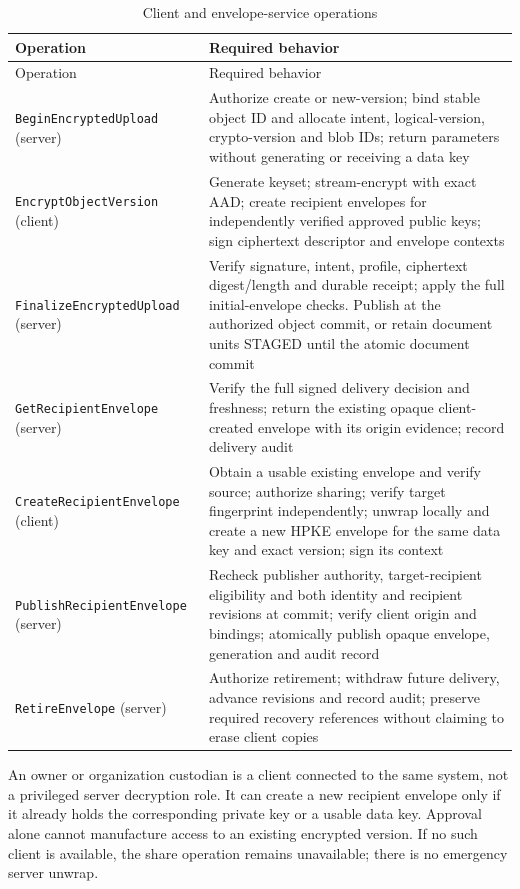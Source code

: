 \documentclass[11pt,a4paper]{article}
\newcommand{\code}[1]{{\small\nolinkurl{#1}}}
\begin{document}
\begin{longtable}{@{}P{0.29\textwidth}P{0.61\textwidth}@{}}
\caption{Client and envelope-service operations}\label{tab:broker}\\
\toprule Operation & Required behavior\\\midrule\endfirsthead
\toprule Operation & Required behavior\\\midrule\endhead
\code{BeginEncryptedUpload} (server) & Authorize create or new-version; bind stable object ID and allocate intent, logical-version, crypto-version and blob IDs; return parameters without generating or receiving a data key\\
\code{EncryptObjectVersion} (client) & Generate keyset; stream-encrypt with exact AAD; create recipient envelopes for independently verified approved public keys; sign ciphertext descriptor and envelope contexts\\
\code{FinalizeEncryptedUpload} (server) & Verify signature, intent, profile, ciphertext digest/length and durable receipt; apply the full initial-envelope checks. Publish at the authorized object commit, or retain document units STAGED until the atomic document commit\\
\code{GetRecipientEnvelope} (server) & Verify the full signed delivery decision and freshness; return the existing opaque client-created envelope with its origin evidence; record delivery audit\\
\code{CreateRecipientEnvelope} (client) & Obtain a usable existing envelope and verify source; authorize sharing; verify target fingerprint independently; unwrap locally and create a new HPKE envelope for the same data key and exact version; sign its context\\
\code{PublishRecipientEnvelope} (server) & Recheck publisher authority, target-recipient eligibility and both identity and recipient revisions at commit; verify client origin and bindings; atomically publish opaque envelope, generation and audit record\\
\code{RetireEnvelope} (server) & Authorize retirement; withdraw future delivery, advance revisions and record audit; preserve required recovery references without claiming to erase client copies\\
\bottomrule
\end{longtable}

An owner or organization custodian is a client connected to the same system, not a privileged server decryption role. It can create a new recipient envelope only if it already holds the corresponding private key or a usable data key. Approval alone cannot manufacture access to an existing encrypted version. If no such client is available, the share operation remains unavailable; there is no emergency server unwrap.
\end{document}
